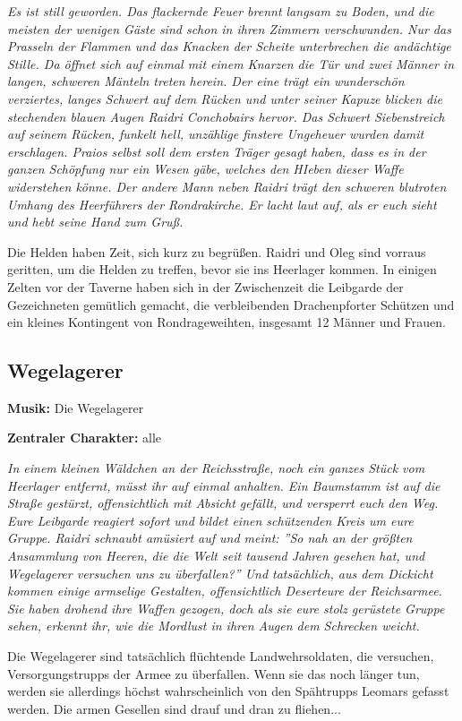 \emph{Es ist still geworden. Das flackernde Feuer brennt langsam zu Boden, und die meisten der wenigen Gäste sind schon in ihren Zimmern verschwunden. Nur das Prasseln der Flammen und das Knacken der Scheite unterbrechen die andächtige Stille. Da öffnet sich auf einmal mit einem Knarzen die Tür und zwei Männer in langen, schweren Mänteln treten herein. Der eine trägt ein wunderschön verziertes, langes Schwert auf dem Rücken und unter seiner Kapuze blicken die stechenden blauen Augen Raidri Conchobairs hervor. Das Schwert Siebenstreich auf seinem Rücken, funkelt hell, unzählige finstere Ungeheuer wurden damit erschlagen. Praios selbst soll dem ersten Träger gesagt haben, dass es in der ganzen Schöpfung nur ein Wesen gäbe, welches den HIeben dieser Waffe widerstehen könne. Der andere Mann neben Raidri trägt den schweren blutroten Umhang des Heerführers der Rondrakirche. Er lacht laut auf, als er euch sieht und hebt seine Hand zum Gruß.} 

Die Helden haben Zeit, sich kurz zu begrüßen. Raidri und Oleg sind vorraus geritten, um die Helden zu treffen, bevor sie ins Heerlager kommen. In einigen Zelten vor der Taverne haben sich in der Zwischenzeit die Leibgarde der Gezeichneten gemütlich gemacht, die verbleibenden Drachenpforter Schützen und ein kleines Kontingent von Rondrageweihten, insgesamt 12 Männer und Frauen.

\subsection{Wegelagerer}

\textbf{Musik:} Die Wegelagerer

\textbf{Zentraler Charakter:} alle 

\emph{In einem kleinen Wäldchen an der Reichsstraße, noch ein ganzes Stück vom Heerlager entfernt, müsst ihr auf einmal anhalten. Ein Baumstamm ist auf die Straße gestürzt, offensichtlich mit Absicht gefällt, und versperrt euch den Weg. Eure Leibgarde reagiert sofort und bildet einen schützenden Kreis um eure Gruppe. Raidri schnaubt amüsiert auf und meint: ''So nah an der größten Ansammlung von Heeren, die die Welt seit tausend Jahren gesehen hat, und Wegelagerer versuchen uns zu überfallen?'' Und tatsächlich, aus dem Dickicht kommen einige armselige Gestalten, offensichtlich Deserteure der Reichsarmee. Sie haben drohend ihre Waffen gezogen, doch als sie eure stolz gerüstete Gruppe sehen, erkennt ihr, wie die Mordlust in ihren Augen dem Schrecken weicht.} 

Die Wegelagerer sind tatsächlich flüchtende Landwehrsoldaten, die versuchen, Versorgungstrupps der Armee zu überfallen. Wenn sie das noch länger tun, werden sie allerdings höchst wahrscheinlich von den Spähtrupps Leomars gefasst werden. Die armen Gesellen sind drauf und dran zu fliehen...

